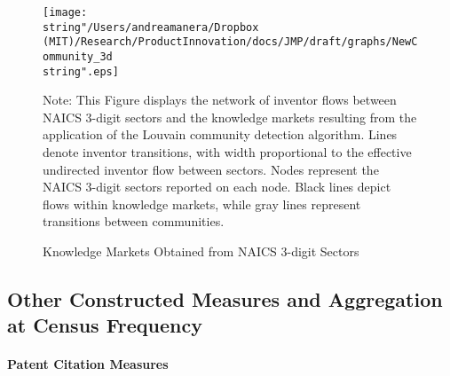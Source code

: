 \begin{figure}[th]
\caption{Knowledge Markets Obtained from NAICS 3-digit Sectors}
\label{fig: KmarketGraph-1}
\begin{centering}
\texttt{[image: \\string"/Users/andreamanera/Dropbox (MIT)/Research/ProductInnovation/docs/JMP/draft/graphs/NewCommunity\_3d\\string".eps]}\\
\par\end{centering}
{\footnotesize{}Note: This Figure displays the network of inventor
flows between NAICS 3-digit sectors and the knowledge markets resulting
from the application of the Louvain community detection algorithm.
Lines denote inventor transitions, with width proportional to the
effective undirected inventor flow between sectors. Nodes represent
the NAICS 3-digit sectors reported on each node. Black lines depict
flows within knowledge markets, while gray lines represent transitions
between communities.}{\footnotesize\par}
\end{figure}

\FloatBarrier

\subsection{Other Constructed Measures and Aggregation at Census Frequency\label{subsec:Other data and aggregation}}

\paragraph{Patent Citation Measures}

